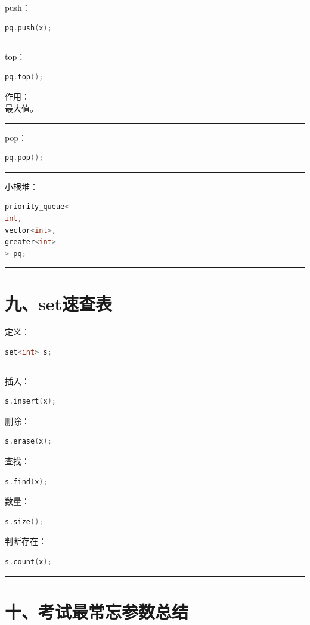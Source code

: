 \documentclass[9pt,twocolumn]{extarticle}
\begin{document}
push：
\begin{lstlisting}[language=C++]
pq.push(x);
\end{lstlisting}

\noindent\rule{\linewidth}{0.4pt}

top：
\begin{lstlisting}[language=C++]
pq.top();
\end{lstlisting}
作用：\\
最大值。

\noindent\rule{\linewidth}{0.4pt}

pop：
\begin{lstlisting}[language=C++]
pq.pop();
\end{lstlisting}

\noindent\rule{\linewidth}{0.4pt}

小根堆：
\begin{lstlisting}[language=C++]
priority_queue<
int,
vector<int>,
greater<int>
> pq;
\end{lstlisting}

\noindent\rule{\linewidth}{0.4pt}

\section{九、set速查表}

定义：
\begin{lstlisting}[language=C++]
set<int> s;
\end{lstlisting}

\noindent\rule{\linewidth}{0.4pt}

插入：
\begin{lstlisting}[language=C++]
s.insert(x);
\end{lstlisting}
删除：
\begin{lstlisting}[language=C++]
s.erase(x);
\end{lstlisting}
查找：
\begin{lstlisting}[language=C++]
s.find(x);
\end{lstlisting}
数量：
\begin{lstlisting}[language=C++]
s.size();
\end{lstlisting}
判断存在：
\begin{lstlisting}[language=C++]
s.count(x);
\end{lstlisting}

\noindent\rule{\linewidth}{0.4pt}

\section{十、考试最常忘参数总结}
\end{document}
